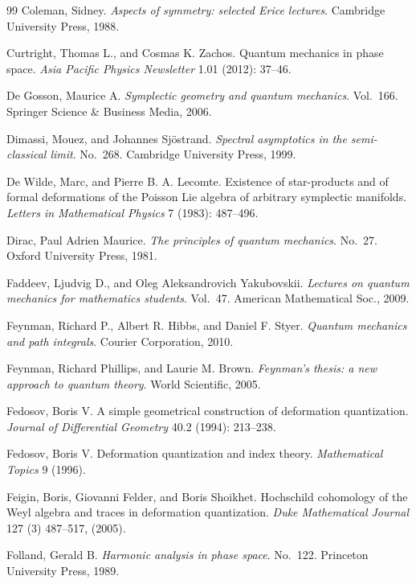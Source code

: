 \begin{thebibliography}{99}
Coleman, Sidney.
\emph{Aspects of symmetry: selected Erice lectures}.
Cambridge University Press, 1988.

Curtright, Thomas L., and Cosmas K. Zachos.
Quantum mechanics in phase space.
\emph{Asia Pacific Physics Newsletter} 1.01 (2012): 37--46.

De Gosson, Maurice A.
\emph{Symplectic geometry and quantum mechanics}. Vol.~166.
Springer Science \& Business Media, 2006.

Dimassi, Mouez, and Johannes Sj\"ostrand.
\emph{Spectral asymptotics in the semi-classical limit}. No.~268.
Cambridge University Press, 1999.

De Wilde, Marc, and Pierre B. A. Lecomte.
Existence of star-products and of formal deformations of the Poisson Lie algebra of
arbitrary symplectic manifolds.
\emph{Letters in Mathematical Physics} 7 (1983): 487--496.

Dirac, Paul Adrien Maurice.
\emph{The principles of quantum mechanics}. No.~27.
Oxford University Press, 1981.

Faddeev, Ljudvig D., and Oleg Aleksandrovich Yakubovskii.
\emph{Lectures on quantum mechanics for mathematics students}. Vol.~47.
American Mathematical Soc., 2009.

Feynman, Richard P., Albert R. Hibbs, and Daniel F. Styer.
\emph{Quantum mechanics and path integrals}. Courier Corporation, 2010.

Feynman, Richard Phillips, and Laurie M. Brown.
\emph{Feynman's thesis: a new approach to quantum theory}. World Scientific, 2005.

Fedosov, Boris V.
A simple geometrical construction of deformation quantization.
\emph{Journal of Differential Geometry} 40.2 (1994): 213--238.

Fedosov, Boris V.
Deformation quantization and index theory.
\emph{Mathematical Topics} 9 (1996).

Feigin, Boris, Giovanni Felder, and Boris Shoikhet.
Hochschild cohomology of the Weyl algebra and traces in deformation quantization.
\emph{Duke Mathematical Journal} 127 (3) 487--517, (2005).

Folland, Gerald B.
\emph{Harmonic analysis in phase space}. No.~122. Princeton University Press, 1989.


\end{thebibliography}
